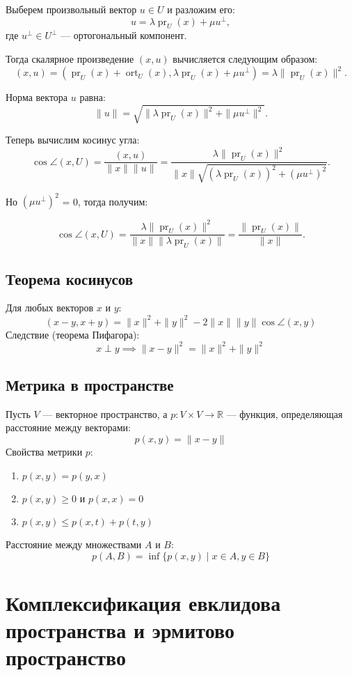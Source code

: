 \documentclass[12pt]{article}
\begin{document}
Выберем произвольный вектор $u \in U$ и разложим его:
\[
u = \lambda \operatorname{pr}_U(x) + \mu u^\perp,
\]
где $u^\perp \in U^\perp$ — ортогональный компонент.

Тогда скалярное произведение $(x, u)$ вычисляется следующим образом:
\[
(x, u) = (\operatorname{pr}_U(x) + \operatorname{ort}_U(x), \lambda \operatorname{pr}_U(x) + \mu u^\perp) = \lambda \|\operatorname{pr}_U(x)\|^2.
\]

Норма вектора $u$ равна:
\[
\|u\| = \sqrt{\|\lambda \operatorname{pr}_U(x)\|^2 + \|\mu u^\perp\|^2}.
\]

Теперь вычислим косинус угла:
\[
\cos \angle(x, U) = \frac{(x, u)}{\|x\| \|u\|} = \frac{\lambda \|\operatorname{pr}_U(x)\|^2}{\|x\| \sqrt{(\lambda \operatorname{pr}_U(x))^2 + (\mu u^\perp)^2}}.
\]

Но $(\mu u^\perp)^2$ = 0, тогда получим:

\[
\cos \angle(x, U) = \frac{\lambda \|\operatorname{pr}_U(x)\|^2}{\|x\| \|\lambda \operatorname{pr}_U(x)\|} = \frac{\|\operatorname{pr}_U(x)\|}{\|x\|}.
\]

\subsection*{Теорема косинусов}
Для любых векторов $x$ и $y$:
\[
(x-y, x+y) = \|x\|^2 + \|y\|^2 - 2 \|x\| \|y\| \cos \angle(x, y)
\]
Следствие (теорема Пифагора):
\[
x \perp y \implies \|x-y\|^2 = \|x\|^2 + \|y\|^2
\]

\subsection*{Метрика в пространстве}
Пусть $V$ — векторное пространство, а $p: V \times V \to \mathbb{R}$ — функция, определяющая расстояние между векторами:
\[
p(x, y) = \|x - y\|
\]
Свойства метрики $p$:
\begin{enumerate}
    \item $p(x, y) = p(y, x)$
    \item $p(x, y) \geq 0$ и $p(x, x) = 0$
    \item $p(x, y) \leq p(x, t) + p(t, y)$
\end{enumerate}
Расстояние между множествами $A$ и $B$:
\[
p(A, B) = \inf \{ p(x, y) \mid x \in A, y \in B \}
\]

\section{Комплексификация евклидова пространства и эрмитово пространство}
\end{document}
